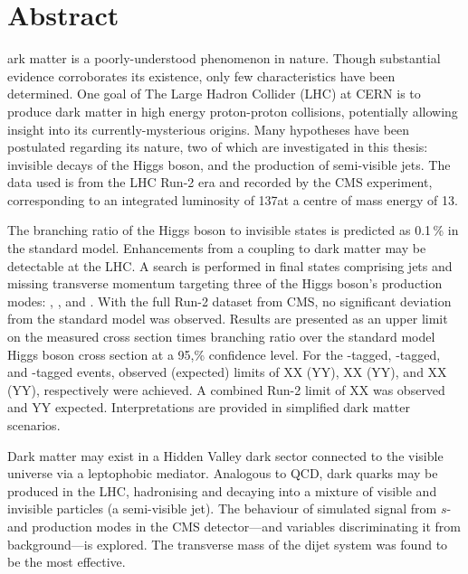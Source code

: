 %
%
%

\chapter*{Abstract}
\begin{SingleSpace}
ark matter is a poorly-understood phenomenon in nature. Though substantial evidence corroborates its existence, only few characteristics have been determined. One goal of The Large Hadron Collider (LHC) at CERN is to produce dark matter in high energy proton-proton collisions, potentially allowing insight into its currently-mysterious origins. Many hypotheses have been postulated regarding its nature, two of which are investigated in this thesis: invisible decays of the Higgs boson, and the production of semi-visible jets. The data used is from the LHC Run-2 era and recorded by the CMS experiment, corresponding to an integrated luminosity of 137\fbinv at a centre of mass energy of 13\TeV.

The branching ratio of the Higgs boson to invisible states is predicted as 0.1\,\% in the standard model. Enhancements from a coupling to dark matter may be detectable at the LHC. A search is performed in final states comprising jets and missing transverse momentum targeting three of the Higgs boson's production modes: \ttH, \VH, and \ggH. With the full Run-2 dataset from CMS, no significant deviation from the standard model was observed. Results are presented as an upper limit on the measured cross section times branching ratio over the standard model Higgs boson cross section at a 95,\% confidence level. For the \ttH-tagged, \VH-tagged, and \ggH-tagged events, observed (expected) limits of XX (YY), XX (YY), and XX (YY), respectively were achieved. A combined Run-2 limit of XX was observed and YY expected. Interpretations are provided in simplified dark matter scenarios.

Dark matter may exist in a Hidden Valley dark sector connected to the visible universe via a leptophobic mediator. Analogous to QCD, dark quarks may be produced in the LHC, hadronising and decaying into a mixture of visible and invisible particles (a semi-visible jet). The behaviour of simulated signal from $s$- and \tchannel production modes in the CMS detector---and variables discriminating it from background---is explored. The transverse mass of the dijet system was found to be the most effective.
\end{SingleSpace}
\clearpage
